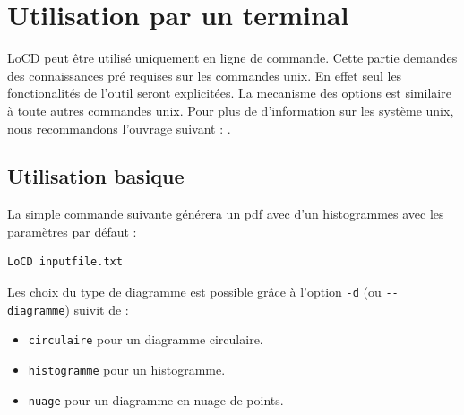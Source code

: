 \chapter{Utilisation par un terminal}
\label{chap:useterm}

\renewcommand{\labelitemi}{$\bullet$} %

LoCD peut être utilisé uniquement en ligne de commande. Cette partie demandes des connaissances pré requises sur les commandes unix. En effet seul les fonctionalités de l'outil seront explicitées. La mecanisme des options est similaire à toute autres commandes unix. Pour plus de d'information sur les système \gls{unix}, nous recommandons l'ouvrage suivant : \cite{linux}.


\section{Utilisation basique}
\label{sec:usebas}
La simple commande suivante générera un pdf avec d'un histogrammes avec les paramètres par défaut : %
\begin{verbatim}LoCD inputfile.txt\end{verbatim}Les choix du type de diagramme est possible grâce à l'option \verb+-d+ (ou \verb+--diagramme+) suivit de : 
\begin{itemize}
\item
\verb+circulaire+ pour un diagramme circulaire.
\item
\verb+histogramme+ pour un histogramme.
\item
\verb+nuage+ pour un diagramme en nuage de points.
\end{itemize}


